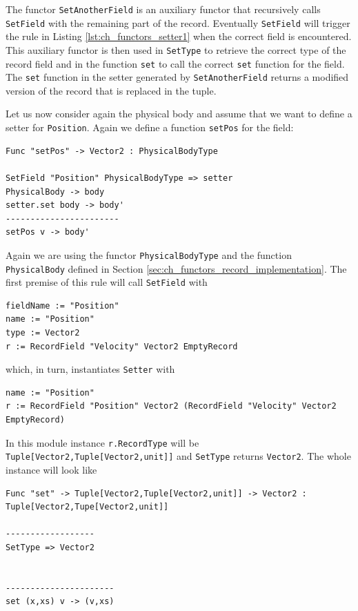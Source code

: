 \noindent
The functor \texttt{SetAnotherField} is an auxiliary functor that recursively calls\\ \texttt{SetField} with the remaining part of the record. Eventually \texttt{SetField} will trigger the rule in Listing \ref{lst:ch_functors_setter1} when the correct field is encountered. This auxiliary functor is then used in \texttt{SetType} to retrieve the correct type of the record field and in the function \texttt{set} to call the correct \texttt{set} function for the field. The \texttt{set} function in the setter generated by \texttt{SetAnotherField} returns a modified version of the record that is replaced in the tuple.

Let us now consider again the physical body and assume that we want to define a setter for \texttt{Position}. Again we define a function \texttt{setPos} for the field:

\begin{lstlisting}
Func "setPos" -> Vector2 : PhysicalBodyType

SetField "Position" PhysicalBodyType => setter
PhysicalBody -> body
setter.set body -> body'
-----------------------
setPos v -> body'
\end{lstlisting}

\noindent
Again we are using the functor \texttt{PhysicalBodyType} and the function\\ \texttt{PhysicalBody} defined in Section \ref{sec:ch_functors_record_implementation}. The first premise of this rule will call \texttt{SetField} with

\begin{lstlisting}
fieldName := "Position"
name := "Position"
type := Vector2
r := RecordField "Velocity" Vector2 EmptyRecord
\end{lstlisting}

\noindent
which, in turn, instantiates \texttt{Setter} with 

\begin{lstlisting}
name := "Position"
r := RecordField "Position" Vector2 (RecordField "Velocity" Vector2 EmptyRecord)
\end{lstlisting}

\noindent
In this module instance \texttt{r.RecordType} will be\\ \texttt{Tuple[Vector2,Tuple[Vector2,unit]]} and \texttt{SetType} returns \texttt{Vector2}. The whole instance will look like

\begin{lstlisting}
Func "set" -> Tuple[Vector2,Tuple[Vector2,unit]] -> Vector2 : Tuple[Vector2,Tupe[Vector2,unit]]

------------------
SetType => Vector2


----------------------
set (x,xs) v -> (v,xs)
\end{lstlisting}

